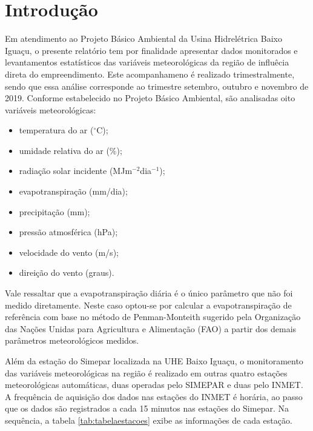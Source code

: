 \documentclass[a4paper,12pt]{article}
\begin{document}
\pagestyle{fancy}
\fancyhead{}     %
\fancyfoot{}     %
\fancyhead[R]{\thepage}

\tableofcontents

\newpage

\listoffigures

\newpage

\listoftables


\newpage
\section{Introdução}

\hspace{0.5cm}
Em atendimento ao Projeto Básico Ambiental da Usina Hidrelétrica Baixo Iguaçu, o presente relatório tem por
finalidade apresentar dados monitorados e levantamentos estatísticos das variáveis meteorológicas da  
região de influêcia direta do empreendimento. Este acompanhameno é realizado trimestralmente,
sendo que essa análise corresponde ao trimestre setembro, outubro e novembro de 2019.
Conforme estabelecido no Projeto Básico Ambiental, são analisadas oito variáveis meteorológicas:

\begin{itemize}
\item temperatura do ar ($^\circ$C);
\item umidade relativa do ar (\%);
\item radiação solar incidente (MJm$^{-2}$dia$^{-1}$);
\item evapotranspiração  (mm/dia);
\item precipitação (mm);
\item pressão atmosférica (hPa);
\item velocidade do vento (m/s);
\item direição do vento (graus).
\end{itemize}

Vale ressaltar que a evapotranspiração diária é o único parâmetro que não foi medido diretamente. Neste caso optou-se por calcular a evapotranspiração de
referência com base no método de Penman-Monteith sugerido pela Organização das Nações Unidas para Agricultura e Alimentação (FAO) a partir dos demais
parâmetros meteorológicos medidos.

Além da estação do Simepar localizada na UHE Baixo Iguaçu, o monitoramento das variáveis meteorológicas na região é realizado em outras quatro
estações meteorológicas automáticas, duas operadas pelo SIMEPAR e duas pelo INMET. A frequência de aquisição dos dados nas estações
do INMET é horária, ao passo que os dados são registrados a cada 15 minutos nas estações do Simepar. Na sequência, a tabela \ref{tab:tabelaestacoes}
exibe as informações de cada estação.
\end{document}

